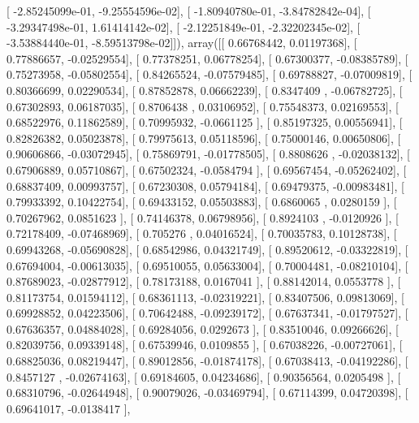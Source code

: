 \documentclass{article}
\begin{document}
       [ -2.85245099e-01,  -9.25554596e-02],
       [ -1.80940780e-01,  -3.84782842e-04],
       [ -3.29347498e-01,   1.61414142e-02],
       [ -2.12251849e-01,  -2.32202345e-02],
       [ -3.53884440e-01,  -8.59513798e-02]]), array([[ 0.66768442,  0.01197368],
       [ 0.77886657, -0.02529554],
       [ 0.77378251,  0.06778254],
       [ 0.67300377, -0.08385789],
       [ 0.75273958, -0.05802554],
       [ 0.84265524, -0.07579485],
       [ 0.69788827, -0.07009819],
       [ 0.80366699,  0.02290534],
       [ 0.87852878,  0.06662239],
       [ 0.8347409 , -0.06782725],
       [ 0.67302893,  0.06187035],
       [ 0.8706438 ,  0.03106952],
       [ 0.75548373,  0.02169553],
       [ 0.68522976,  0.11862589],
       [ 0.70995932, -0.0661125 ],
       [ 0.85197325,  0.00556941],
       [ 0.82826382,  0.05023878],
       [ 0.79975613,  0.05118596],
       [ 0.75000146,  0.00650806],
       [ 0.90606866, -0.03072945],
       [ 0.75869791, -0.01778505],
       [ 0.8808626 , -0.02038132],
       [ 0.67906889,  0.05710867],
       [ 0.67502324, -0.0584794 ],
       [ 0.69567454, -0.05262402],
       [ 0.68837409,  0.00993757],
       [ 0.67230308,  0.05794184],
       [ 0.69479375, -0.00983481],
       [ 0.79933392,  0.10422754],
       [ 0.69433152,  0.05503883],
       [ 0.6860065 ,  0.0280159 ],
       [ 0.70267962,  0.0851623 ],
       [ 0.74146378,  0.06798956],
       [ 0.8924103 , -0.0120926 ],
       [ 0.72178409, -0.07468969],
       [ 0.705276  ,  0.04016524],
       [ 0.70035783,  0.10128738],
       [ 0.69943268, -0.05690828],
       [ 0.68542986,  0.04321749],
       [ 0.89520612, -0.03322819],
       [ 0.67694004, -0.00613035],
       [ 0.69510055,  0.05633004],
       [ 0.70004481, -0.08210104],
       [ 0.87689023, -0.02877912],
       [ 0.78173188,  0.0167041 ],
       [ 0.88142014,  0.0553778 ],
       [ 0.81173754,  0.01594112],
       [ 0.68361113, -0.02319221],
       [ 0.83407506,  0.09813069],
       [ 0.69928852,  0.04223506],
       [ 0.70642488, -0.09239172],
       [ 0.67637341, -0.01797527],
       [ 0.67636357,  0.04884028],
       [ 0.69284056,  0.0292673 ],
       [ 0.83510046,  0.09266626],
       [ 0.82039756,  0.09339148],
       [ 0.67539946,  0.0109855 ],
       [ 0.67038226, -0.00727061],
       [ 0.68825036,  0.08219447],
       [ 0.89012856, -0.01874178],
       [ 0.67038413, -0.04192286],
       [ 0.8457127 , -0.02674163],
       [ 0.69184605,  0.04234686],
       [ 0.90356564,  0.0205498 ],
       [ 0.68310796, -0.02644948],
       [ 0.90079026, -0.03469794],
       [ 0.67114399,  0.04720398],
       [ 0.69641017, -0.0138417 ],
\end{document}
